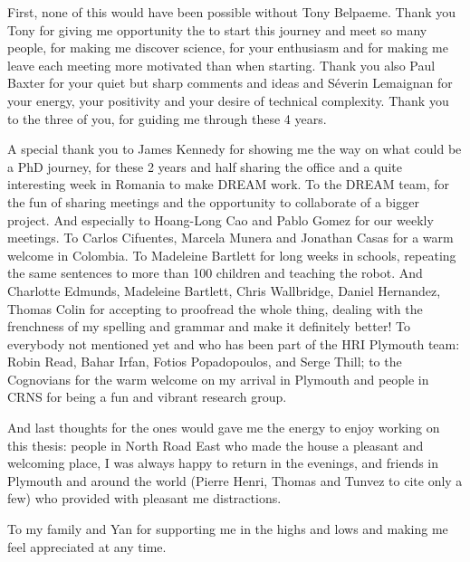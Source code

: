 First, none of this would have been possible without Tony Belpaeme. Thank you Tony for giving me opportunity the to start this journey and meet so many people, for making me discover science, for your enthusiasm and for making me leave each meeting more motivated than when starting. Thank you also Paul Baxter for your quiet but sharp comments and ideas %
and S\'{e}verin Lemaignan for your energy, your positivity and your desire of technical complexity. Thank you to the three of you, for guiding me through these 4 years.

A special thank you to James Kennedy for showing me the way on what could be a PhD journey, for these 2 years and half sharing the office and a quite interesting week in Romania to make DREAM work. To the DREAM team, for the fun of sharing meetings and the opportunity to collaborate of a bigger project. And especially to Hoang-Long Cao and Pablo Gomez for our weekly meetings. To Carlos Cifuentes, Marcela Munera and Jonathan Casas for a warm welcome in Colombia. To Madeleine Bartlett for long weeks in schools, repeating the same sentences to more than 100 children and teaching the robot. And Charlotte Edmunds, Madeleine Bartlett, Chris Wallbridge, Daniel Hernandez, Thomas Colin for accepting to proofread the whole thing, dealing with the frenchness of my spelling and grammar and make it definitely better! To everybody not mentioned yet and who has been part of the HRI Plymouth team: Robin Read, Bahar Irfan, Fotios Popadopoulos, and Serge Thill; to the Cognovians for the warm welcome on my arrival in Plymouth and people in CRNS for being a fun and vibrant research group.

And last thoughts for the ones would gave me the energy to enjoy working on this thesis: people in North Road East who made the house a pleasant and welcoming place, I was always happy to return in the evenings, and friends in Plymouth and around the world (Pierre Henri, Thomas and Tunvez to cite only a few) who provided with pleasant me distractions.

To my family and Yan for supporting me in the highs and lows and making me feel appreciated at any time.